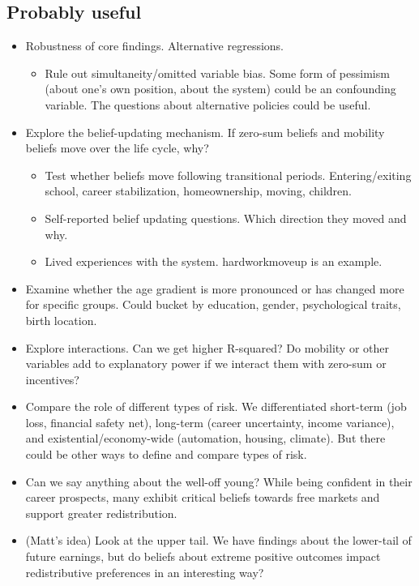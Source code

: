 \documentclass{article}
\begin{document}
\subsection*{Probably useful}
\begin{itemize}
    \item Robustness of core findings. Alternative regressions.
    \begin{itemize}
        \item Rule out simultaneity/omitted variable bias. Some form of pessimism (about one's own position, about the system) could be an confounding variable. The questions about alternative policies could be useful.
    \end{itemize}
    \item Explore the belief-updating mechanism. If zero-sum beliefs and mobility beliefs move over the life cycle, why?
    \begin{itemize}
        \item Test whether beliefs move following transitional periods. Entering/exiting school, career stabilization, homeownership, moving, children.
        \item Self-reported belief updating questions. Which direction they moved and why. 
        \item Lived experiences with the system. hardworkmoveup is an example.  
    \end{itemize}
    \item Examine whether the age gradient is more pronounced or has changed more for specific groups. Could bucket by education, gender, psychological traits, birth location.
    \item Explore interactions. Can we get higher R-squared? Do mobility or other variables add to explanatory power if we interact them with zero-sum or incentives? 
    \item Compare the role of different types of risk. We differentiated short-term (job loss, financial safety net), long-term (career uncertainty, income variance), and existential\slash economy-wide (automation, housing, climate). But there could be other ways to define and compare types of risk.
    \item Can we say anything about the well-off young? While being confident in their career prospects, many exhibit critical beliefs towards free markets and support greater redistribution.
    \item (Matt's idea) Look at the upper tail. We have findings about the lower-tail of future earnings, but do beliefs about extreme positive outcomes impact redistributive preferences in an interesting way?
\end{itemize}
\end{document}
